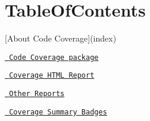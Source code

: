 \chapter{Table\+Of\+Contents}
\hypertarget{md__library_2_package_cache_2com_8unity_8testtools_8codecoverage_0d1_82_85_2_documentation_0i_2_table_of_contents}{}\label{md__library_2_package_cache_2com_8unity_8testtools_8codecoverage_0d1_82_85_2_documentation_0i_2_table_of_contents}

\begin{DoxyItemize}
\item \mbox{[}About Code Coverage\mbox{]}(index)
\end{DoxyItemize}

\begin{DoxyItemize}
\item {}
\item \href{index\#code-coverage-package}{\texttt{ Code Coverage package}}
\item \href{index\#coverage-html-report}{\texttt{ Coverage HTML Report}}
\item \href{index\#other-reports}{\texttt{ Other Reports}}
\item \href{index\#coverage-summary-badges}{\texttt{ Coverage Summary Badges}}
\end{DoxyItemize}


